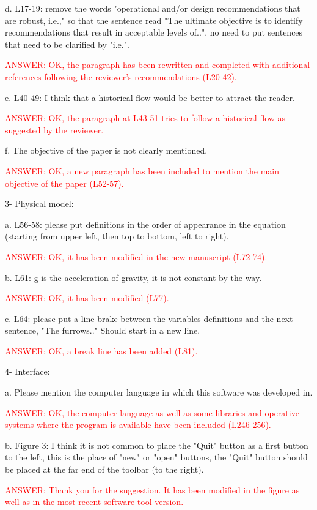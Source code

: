 \documentclass[a4paper]{article}
\begin{document}
d. L17-19: remove the words "operational and/or design recommendations that are robust, i.e.," so that the sentence read "The ultimate objective is to identify recommendations that result in acceptable levels of..". no need to put sentences that need to be clarified by "i.e.".

\textcolor{red}{ANSWER: OK, the paragraph has been rewritten and completed with
additional references following the reviewer's recommendations (L20-42).}

e. L40-49: I think that a historical flow would be better to attract the reader.

\textcolor{red}{ANSWER: OK, the paragraph at L43-51 tries to follow a historical
flow as suggested by the reviewer.}

f. The objective of the paper is not clearly mentioned.

\textcolor{red}{ANSWER: OK, a new paragraph has been included to mention the
main objective of the paper (L52-57).}

3- Physical model:

a. L56-58: please put definitions in the order of appearance in the equation (starting from upper left, then top to bottom, left to right).

\textcolor{red}{ANSWER: OK, it has been modified in the new manuscript
(L72-74).}

b. L61: g is the acceleration of gravity, it is not constant by the way.

\textcolor{red}{ANSWER: OK, it has been modified (L77).}

c. L64: please put a line brake between the variables definitions and the next sentence, "The furrows.." Should start in a new line.

\textcolor{red}{ANSWER: OK, a break line has been added (L81).}

4- Interface:

a. Please mention the computer language in which this software was developed in.

\textcolor{red}{ANSWER: OK, the computer language as well as some libraries and
operative systems where the program is available have been included (L246-256).}

b. Figure 3: I think it is not common to place the "Quit" button as a first button to the left, this is the place of "new" or "open" buttons, the "Quit" button should be placed at the far end of the toolbar (to the right).

\textcolor{red}{ANSWER: Thank you for the suggestion. It has been modified in
the figure as well as in the most recent software tool version.}
\end{document}

